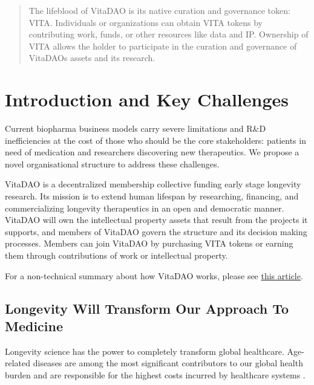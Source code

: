 \documentclass[10pt,letterpaper]{article}
\begin{document}
\begin{abstract}
The lifeblood of VitaDAO is its native curation and governance token: VITA. Individuals or organizations can obtain VITA tokens by contributing work, funds, or other resources like data and IP. Ownership of VITA allows the holder to participate in the curation and governance of VitaDAOs assets and its research.

\end{abstract}

\newpage
\renewcommand{\contentsname}{\centering Table of Contents}

\tableofcontents

\newpage

\section{Introduction and Key Challenges}
Current biopharma business models carry severe limitations and R\&D inefficiencies at the cost of those who should be the core stakeholders: patients in need of medication and researchers discovering new therapeutics. We propose a novel organisational structure to address these challenges.
 
VitaDAO is a decentralized membership collective funding early stage longevity research. Its mission is to extend human lifespan by researching, financing, and commercializing longevity therapeutics in an open and democratic manner. VitaDAO will own the intellectual property assets that result from the projects it supports, and members of VitaDAO govern the structure and its decision making processes. Members can join VitaDAO by purchasing VITA tokens or earning them through contributions of work or intellectual property.

For a non-technical summary about how VitaDAO works, please see \href{https://vitadao.medium.com/how-vitadao-works-61bbf861fe96}{this article}.

\subsection{Longevity Will Transform Our Approach To Medicine}
Longevity science has the power to completely transform global healthcare. Age-related diseases are among the most significant contributors to our global health burden and are responsible for the highest costs incurred by healthcare systems \citep{WHO2011}. 
\end{document}
